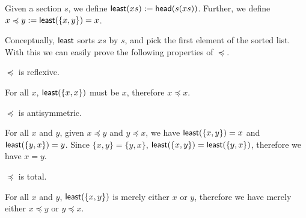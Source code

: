 \begin{definition}
Given a section $s$, we define $\operatorname{\mathsf{least}}(xs) := \operatorname{\mathsf{head}}(s(xs))$.
Further, we define $x \preccurlyeq y := \operatorname{\mathsf{least}}(\{x, y\}) = x$. 
\end{definition}

Conceptually, $\operatorname{\mathsf{least}}$ sorts $xs$ by $s$, and pick the first element of the sorted list.
With this we can easily prove the following properties of $\preccurlyeq$.

\begin{theorem}
$\preccurlyeq$ is reflexive.
\end{theorem}
For all $x$, $\operatorname{\mathsf{least}}(\{x, x\})$ must be $x$, therefore $x \preccurlyeq x$.

\begin{theorem}
$\preccurlyeq$ is antisymmetric.
\end{theorem}
For all $x$ and $y$, given $x \preccurlyeq y$ and $y \preccurlyeq x$,
we have $\operatorname{\mathsf{least}}(\{x, y\}) = x$ and $\operatorname{\mathsf{least}}(\{y, x\}) = y$.
Since $\{x, y\} = \{y, x\}$, $\operatorname{\mathsf{least}}(\{x, y\}) = \operatorname{\mathsf{least}}(\{y, x\})$,
therefore we have $x = y$.

\begin{theorem}
$\preccurlyeq$ is total.
\end{theorem}
For all $x$ and $y$, $\operatorname{\mathsf{least}}(\{x, y\})$ is merely either $x$ or $y$,
therefore we have merely either $x \preccurlyeq y$ or $y \preccurlyeq x$.
